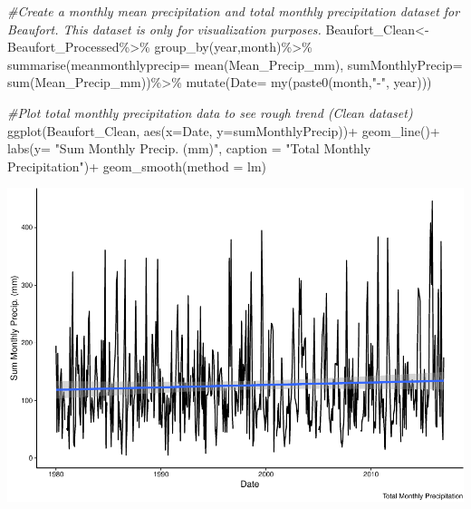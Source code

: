 \documentclass[
  12pt,
]{article}
\newenvironment{Shaded}{\begin{snugshade}}{\end{snugshade}}
\newcommand{\AttributeTok}[1]{\textcolor[rgb]{0.77,0.63,0.00}{#1}}
\newcommand{\CommentTok}[1]{\textcolor[rgb]{0.56,0.35,0.01}{\textit{#1}}}
\newcommand{\FunctionTok}[1]{\textcolor[rgb]{0.00,0.00,0.00}{#1}}
\newcommand{\NormalTok}[1]{#1}
\newcommand{\OtherTok}[1]{\textcolor[rgb]{0.56,0.35,0.01}{#1}}
\newcommand{\SpecialCharTok}[1]{\textcolor[rgb]{0.00,0.00,0.00}{#1}}
\newcommand{\StringTok}[1]{\textcolor[rgb]{0.31,0.60,0.02}{#1}}
\begin{document}
\begin{Shaded}
\begin{Highlighting}[]
\CommentTok{\#Create a monthly mean precipitation and total monthly precipitation dataset for Beaufort. This dataset is only for visualization purposes. }
\NormalTok{Beaufort\_Clean}\OtherTok{\textless{}{-}}\NormalTok{ Beaufort\_Processed}\SpecialCharTok{\%\textgreater{}\%}
  \FunctionTok{group\_by}\NormalTok{(year,month)}\SpecialCharTok{\%\textgreater{}\%}
   \FunctionTok{summarise}\NormalTok{(}\AttributeTok{meanmonthlyprecip=} \FunctionTok{mean}\NormalTok{(Mean\_Precip\_mm),}
             \AttributeTok{sumMonthlyPrecip=} \FunctionTok{sum}\NormalTok{(Mean\_Precip\_mm))}\SpecialCharTok{\%\textgreater{}\%}
  \FunctionTok{mutate}\NormalTok{(}\AttributeTok{Date=} \FunctionTok{my}\NormalTok{(}\FunctionTok{paste0}\NormalTok{(month,}\StringTok{"{-}"}\NormalTok{, year)))}

\CommentTok{\#Plot total monthly precipitation data to see rough trend (Clean dataset)}
\FunctionTok{ggplot}\NormalTok{(Beaufort\_Clean, }\FunctionTok{aes}\NormalTok{(}\AttributeTok{x=}\NormalTok{Date, }\AttributeTok{y=}\NormalTok{sumMonthlyPrecip))}\SpecialCharTok{+}
  \FunctionTok{geom\_line}\NormalTok{()}\SpecialCharTok{+}
  \FunctionTok{labs}\NormalTok{(}\AttributeTok{y=} \StringTok{"Sum Monthly Precip. (mm)"}\NormalTok{, }\AttributeTok{caption =} \StringTok{"Total Monthly Precipitation"}\NormalTok{)}\SpecialCharTok{+}
  \FunctionTok{geom\_smooth}\NormalTok{(}\AttributeTok{method =}\NormalTok{ lm) }
\end{Highlighting}
\end{Shaded}

\includegraphics{Final_Project_Thornton_Katayama_Ngenzi_files/figure-latex/clean-1.pdf}
\end{document}
